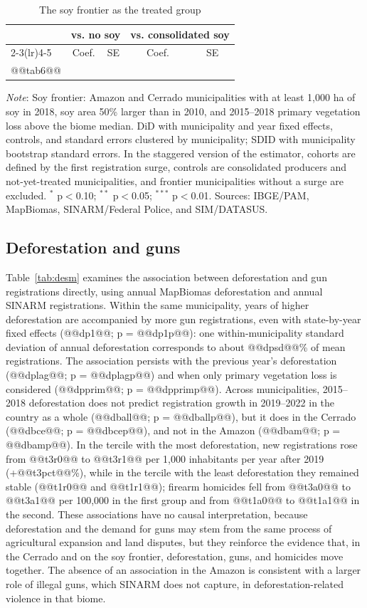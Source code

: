 \documentclass[11pt,a4paper]{article}
\newcommand{\nota}[1]{\par\vspace{2pt}\begin{minipage}{\linewidth}\footnotesize\textit{Note}: #1\end{minipage}}
\begin{document}
\begin{table}[H]
\centering\footnotesize\setlength{\tabcolsep}{4pt}
\caption{The soy frontier as the treated group}\label{tab:soja}
\begin{tabular}{lcccc}
\toprule
 & \multicolumn{2}{c}{vs. no soy} & \multicolumn{2}{c}{vs. consolidated soy} \\
\cmidrule(lr){2-3}\cmidrule(lr){4-5}
 & Coef. & SE & Coef. & SE \\
\midrule
@@tab6@@
\bottomrule
\end{tabular}
\nota{Soy frontier: Amazon and Cerrado municipalities with at least 1,000 ha of soy in 2018, soy area 50\% larger than in 2010, and 2015--2018 primary vegetation loss above the biome median. DiD with municipality and year fixed effects, controls, and standard errors clustered by municipality; SDID with municipality bootstrap standard errors. In the staggered version of the \citet{callaway2021} estimator, cohorts are defined by the first registration surge, controls are consolidated producers and not-yet-treated municipalities, and frontier municipalities without a surge are excluded. $^{*}$ p$<$0.10; $^{**}$ p$<$0.05; $^{***}$ p$<$0.01. Sources: IBGE/PAM, MapBiomas, SINARM/Federal Police, and SIM/DATASUS.}
\end{table}

\subsection*{Deforestation and guns}

Table~\ref{tab:desm} examines the association between deforestation and gun registrations directly, using annual MapBiomas deforestation and annual SINARM registrations. Within the same municipality, years of higher deforestation are accompanied by more gun registrations, even with state-by-year fixed effects (@@dp1@@; p = @@dp1p@@): one within-municipality standard deviation of annual deforestation corresponds to about @@dpsd@@\% of mean registrations. The association persists with the previous year's deforestation (@@dplag@@; p = @@dplagp@@) and when only primary vegetation loss is considered (@@dpprim@@; p = @@dpprimp@@). Across municipalities, 2015--2018 deforestation does not predict registration growth in 2019--2022 in the country as a whole (@@dball@@; p = @@dballp@@), but it does in the Cerrado (@@dbce@@; p = @@dbcep@@), and not in the Amazon (@@dbam@@; p = @@dbamp@@). In the tercile with the most deforestation, new registrations rose from @@t3r0@@ to @@t3r1@@ per 1,000 inhabitants per year after 2019 (+@@t3pct@@\%), while in the tercile with the least deforestation they remained stable (@@t1r0@@ and @@t1r1@@); firearm homicides fell from @@t3a0@@ to @@t3a1@@ per 100,000 in the first group and from @@t1a0@@ to @@t1a1@@ in the second. These associations have no causal interpretation, because deforestation and the demand for guns may stem from the same process of agricultural expansion and land disputes, but they reinforce the evidence that, in the Cerrado and on the soy frontier, deforestation, guns, and homicides move together. The absence of an association in the Amazon is consistent with a larger role of illegal guns, which SINARM does not capture, in deforestation-related violence in that biome.
\end{document}

